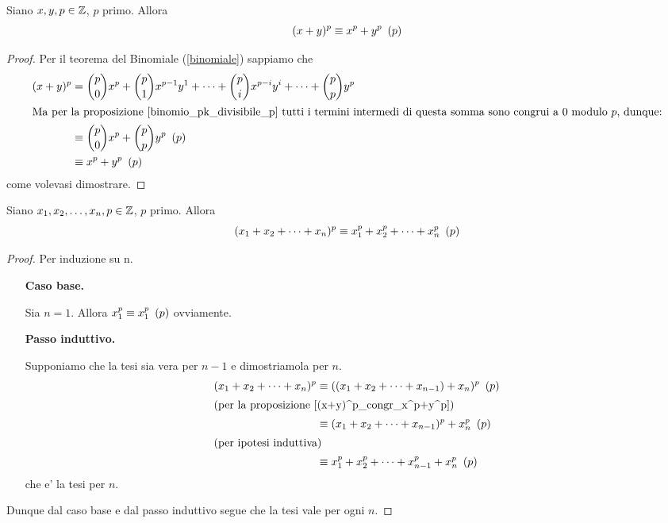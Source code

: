 \begin{proposition}\label{(x+y)^p_congr_x^p+y^p}
    Siano $x, y, p \in \mathbb{Z}$, $p$ primo. Allora
    \begin{equation}
        (x+y)^p \equiv x^p + y^p \ \left(p\right)
    \end{equation}
\end{proposition}
\begin{proof}
    Per il teorema del Binomiale (\ref{binomiale}) sappiamo che
    \begin{alignat*}{1}
        (x+y)^p &= \binom{p}{0}x^p + \binom{p}{1}x^{p-1}y^1 + \dots + \binom{p}{i}x^{p-i}y^i + \dots + \binom{p}{p}y^p \\
        \intertext{Ma per la proposizione \ref{binomio_pk_divisibile_p} tutti i termini intermedi di questa somma sono congrui a $0$ modulo $p$, dunque:}
        &\equiv \binom{p}{0}x^p + \binom{p}{p}y^p \ \left(p\right)\\
        &\equiv x^p + y^p \ \left(p\right)
    \end{alignat*}
    come volevasi dimostrare.
\end{proof}

\begin{corollary}\label{(x_1+x_n)^p_congr_x_1^p+x_n^p}
    Siano $x_1, x_2, \dots, x_n, p \in \mathbb{Z}$, $p$ primo. Allora
    \begin{equation}
        (x_1+x_2+\dots+x_n)^p \equiv x_1^p + x_2^p + \dots + x_n^p \ \left(p\right)
    \end{equation}
\end{corollary}
\begin{proof}
    Per induzione su n.
    \begin{itemize}
        \item[\textbf{Caso base.}]

        Sia $n = 1$. Allora $x_1^p \equiv x_1^p \ \left(p\right)$ ovviamente.
        \item[\textbf{Passo induttivo.}]
        
        Supponiamo che la tesi sia vera per $n-1$ e dimostriamola per $n$.
        \begin{alignat*}{1}
            (x_1+x_2+\dots+x_n)^p &\equiv ((x_1+x_2+\dots+x_{n-1})+x_n)^p \ \left(p\right)\\
            \intertext{(per la proposizione \ref{(x+y)^p_congr_x^p+y^p})}
            &\equiv (x_1+x_2+\dots+x_{n-1})^p+x_n^p\ \left(p\right)\\
            \intertext{(per ipotesi induttiva)}
            &\equiv x_1^p + x_2^p + \dots + x_{n-1}^p + x_n^p\ \left(p\right)
        \end{alignat*}
        che e' la tesi per $n$.
    \end{itemize}
    Dunque dal caso base e dal passo induttivo segue che la tesi vale per ogni $n$.
\end{proof}

